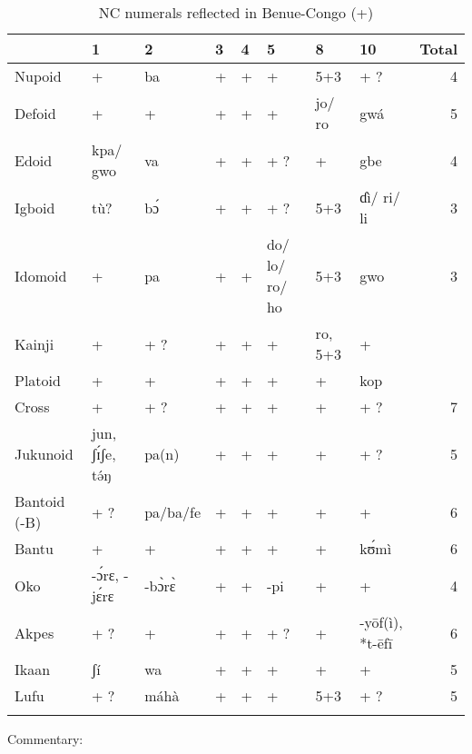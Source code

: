 \begin{table}
\caption{\label{tab:5:1}NC numerals reflected in Benue-Congo (+)}


\begin{tabularx}{\textwidth}{X QlllQlQr}
\lsptoprule
& {1} & {2} & {3} & {4} & {5} & {8} & {10} & {Total}\\
\midrule
Nupoid & {+} & {ba} & {+} & {+} & {+} & {5+3} & {+} ? & {4}\\
Defoid & {+} & {+} & {+} & {+} & {+} & {jo/} {ro} & {gwá} & {5}\\
Edoid & {kpa/} {gwo} & {va} & {+} & {+} & {+} ? & {+} & {gbe} & {4}\\
Igboid & {t{\`{u}}?} & {b{\'{ɔ}}} & {+} & {+} & {+} ? & {5+3} & {ɗì/} {ri/} {li} & {\color{blue}3}\\
Idomoid & {+} & {pa} & {+} & {+} & {do/ lo/ ro/ ho} & {5+3} & {gwo} & {\color{blue}3}\\
Kainji & {+} & {+} ? & {+} & {+} & {+} & {ro,} {5+3} & {+} & \color{red}{6}\\
Platoid & {+} & {+} & {+} & {+} & {+} & {+} & {kop} & \color{red}{6}\\
Cross & {+} & {+} ? & {+} & {+} & {+} & {+} & {+} ? &\color{red} {7}\\
Jukunoid & {jun,} {ʃ{\'{ɪ}}ʃe,}  {t{\'{ə}}ŋ} & {pa(n)} & {+} & {+} & {+} & {+} & {+} ? & {5}\\
Bantoid (-B) & {+} ? & {pa/ba/fe} & {+} & {+} & {+} & {+} & {+} &\color{red} {6}\\
Bantu & {+} & {+} & {+} & {+} & {+} & {+} & {k{\'{ʊ}}mì} &\color{red} {6}\\
Oko & {-{\'{ɔ}}rɛ, -j{\'{ɛ}}rɛ} & {-b{\`{ɔ}}r{\`{ɛ}}} & {+} & {+} & {-pi} & {+} & {+} & {4}\\
Akpes & {+} ? & {+} & {+} & {+} & {+} ? & {+} & {-y{\={o}}f(ì), *t-{\={e}}f{\={i}}} &\color{red} {6}\\
Ikaan & {ʃí} & {wa} & {+} & {+} & {+} & {+} & {+} & {5}\\
Lufu & {+} ? & {máhà} & {+} & {+} & {+} & {5+3} & {+} ? & {5}\\
\lspbottomrule
\end{tabularx}
\end{table}
Commentary:

